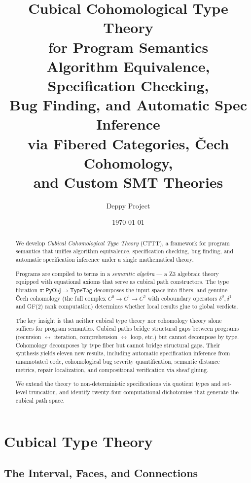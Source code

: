 \documentclass[11pt,a4paper]{report}
\title{
  \textbf{Cubical Cohomological Type Theory}\\
  \textbf{for Program Semantics}\\[1em]
  \large Algorithm Equivalence, Specification Checking,\\
  Bug Finding, and Automatic Spec Inference\\
  via Fibered Categories, \v{C}ech Cohomology,\\
  and Custom SMT Theories
}
\author{Deppy Project}
\date{\today}
\theoremstyle{definition}
\theoremstyle{plain}
\newcommand{\PyObj}{\mathsf{PyObj}}
\begin{document}
\maketitle

\begin{abstract}
We develop \emph{Cubical Cohomological Type Theory} (CTTT), a framework
for program semantics that unifies algorithm equivalence, specification
checking, bug finding, and automatic specification inference under a
single mathematical theory.

Programs are compiled to terms in a \emph{semantic algebra}
--- a Z3 algebraic theory equipped with equational axioms that serve as
cubical path constructors.  The type fibration $\pi : \PyObj \to
\mathsf{TypeTag}$ decomposes the input space into fibers, and
genuine \v{C}ech cohomology (the full complex $C^0 \to C^1 \to C^2$
with coboundary operators $\delta^0, \delta^1$ and GF(2) rank
computation) determines whether local results glue to global verdicts.

The key insight is that neither cubical type theory nor cohomology
theory alone suffices for program semantics.  Cubical paths bridge
structural gaps between programs (recursion $\leftrightarrow$ iteration,
comprehension $\leftrightarrow$ loop, etc.) but cannot decompose by
type.  Cohomology decomposes by type fiber but cannot bridge structural
gaps.  Their synthesis yields eleven new results, including automatic
specification inference from unannotated code, cohomological bug
severity quantification, semantic distance metrics, repair localization,
and compositional verification via sheaf gluing.

We extend the theory to non-deterministic specifications via quotient
types and set-level truncation, and identify twenty-four computational
dichotomies that generate the cubical path space.
\end{abstract}

\tableofcontents

\part{Cubical Type Theory}

\chapter{The Interval, Faces, and Connections}
\label{ch:interval}
\end{document}
